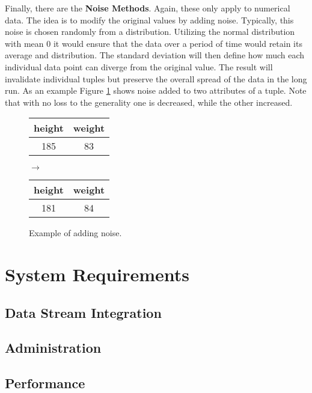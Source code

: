 Finally, there are the \textbf{Noise Methods}. Again, these only apply to numerical data. The idea is to modify the original values by adding noise. Typically, this noise is chosen randomly from a distribution. Utilizing the normal distribution with mean 0 it would ensure that the data over a period of time would retain its average and distribution. The standard deviation will then define how much each individual data point can diverge from the original value. The result will invalidate individual tuples but preserve the overall spread of the data in the long run. As an example Figure \ref{fig:noise} shows noise added to two attributes of a tuple. Note that with no loss to the generality one is decreased, while the other increased. 

\bigskip

\begin{figure}[ht]
    \begin{center}
    \footnotesize{
        \renewcommand{\arraystretch}{1.5}
        \begin{tabular}{|c|c|}
            \hline
            height & weight \\
            \hline
            185 & 83 \\
            \hline
            \end{tabular}
            \quad $\longrightarrow$ \quad
            \begin{tabular}{|c|c|}
            \hline
            height & weight  \\
            \hline
            181 & 84\\
            \hline
        \end{tabular}
    }
    \end{center}
    \caption{Example of adding noise.\label{fig:noise}}
\end{figure}

\section{System Requirements}
\subsection{Data Stream Integration}
\subsection{Administration}
\subsection{Performance}
